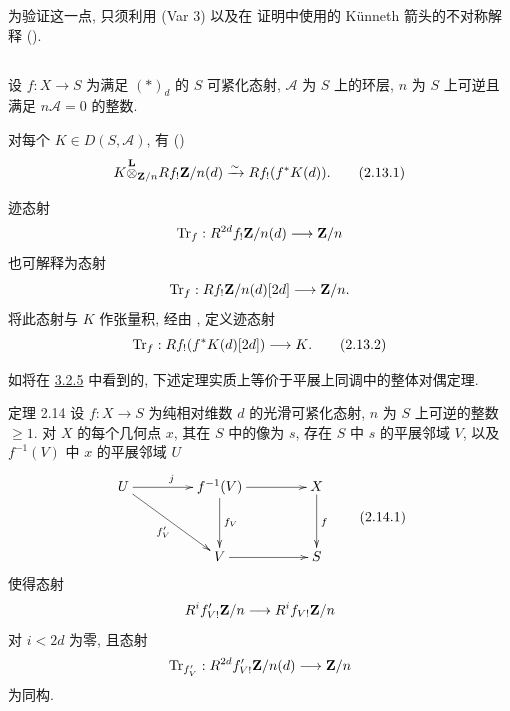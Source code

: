 为验证这一点, 只须利用 (Var 3) 以及在  证明中使用的 Künneth 箭头的不对称解释 ().

\setcounter{subsection}{12}
\subsection{}
设 $f:X\rightarrow S$ 为满足 $(\ast)_{d}$ 的 $S$ 可紧化态射, $\mathcal{A}$ 为 $S$ 上的环层, $n$ 为 $S$ 上可逆且满足 $n\mathcal{A}=0$ 的整数.

对每个 $K\in D(S,\mathcal{A})$, 有 ()
\begin{equation*}
K{\mathop{\otimes}^{\mathbf{L}}}_{\mathbf{Z}/n}Rf_{!}\mathbf{Z}/n(d)\xrightarrow{\sim} Rf_{!}(f^{\ast}K(d)){}.\tag{2.13.1}
\end{equation*}

迹态射
$$
\operatorname{Tr}_{f}:R^{2d}f_{!}\mathbf{Z}/n(d)\longrightarrow \mathbf{Z}/n
$$
也可解释为态射
$$
\operatorname{Tr}_{f}:Rf_{!}\mathbf{Z}/n(d)[2d]\longrightarrow \mathbf{Z}/n{}.
$$
将此态射与 $K$ 作张量积, 经由 , 定义迹态射
\begin{equation*}
\operatorname{Tr}_{f}:Rf_{!}(f^{\ast}K(d)[2d])\longrightarrow K{}.\tag{2.13.2}
\end{equation*}

如将在 \hyperref[XVIII.thm3.2.5]{3.2.5} 中看到的, 下述定理实质上等价于平展上同调中的整体对偶定理.

\begin{enonce*}{定理 2.14}
设 $f:X\rightarrow S$ 为纯相对维数 $d$ 的光滑可紧化态射, $n$ 为 $S$ 上可逆的整数 $\geq 1$. 对 $X$ 的每个几何点 $x$, 其在 $S$ 中的像为 $s$, 存在 $S$ 中 $s$ 的平展邻域 $V$, 以及 $f^{-1}(V)$ 中 $x$ 的平展邻域 $U$
\begin{equation*}
\vcenter{
\xymatrix@C=1.5cm@R=1.25cm{
U \ar[rd]_{f'_V} \ar[r]^{j} & f^{-1}(V)   \ar[r] \ar[d]^{f_V}& X\ar[d]^{f}\\
                                             &     V           \ar[r]  & S
}}\tag{2.14.1}
\end{equation*}%
使得\pageoriginale 态射 
$$
R^{i}f'_{V!}\mathbf{Z}/n\longrightarrow R^{i}f_{V!}\mathbf{Z}/n
$$
对 $i<2d$ 为零, 且态射
$$
\operatorname{Tr}_{f'_{V}}:R^{2d}f'_{V!}\mathbf{Z}/n(d)\longrightarrow \mathbf{Z}/n
$$
为同构.
\end{enonce*}

